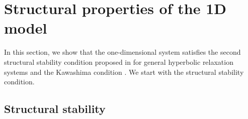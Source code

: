 \documentclass{article}
\theoremstyle{plain}
\begin{document}

\section{Structural properties of the 1D model}
\setcounter{equation}{0}

In this section, we show that the one-dimensional system satisfies the second structural stability condition proposed in \cite{yong1992singular,yong2001basic} for general hyperbolic relaxation systems and the Kawashima condition \cite{kawashima1985systems}. We start with the structural stability condition.

\subsection{Structural stability}
\end{document}
